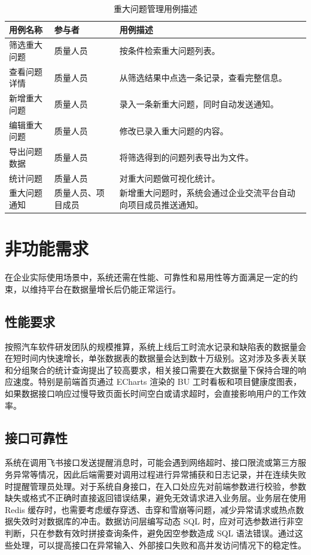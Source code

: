 \begin{table}[htbp]
	\centering
	\caption{重大问题管理用例描述}
	\label{tab:major-issue-usecase}
	{\songti\seuwuhao\selectfont
		\begin{tabular}{p{3.2cm} p{2.2cm} p{8.5cm}}
			\toprule
			用例名称 & 参与者 & 用例描述 \\
			\midrule
			筛选重大问题 & 质量人员 & 按条件检索重大问题列表。 \\
			查看问题详情 & 质量人员 & 从筛选结果中点选一条记录，查看完整信息。 \\
			新增重大问题 & 质量人员 & 录入一条新重大问题，同时自动发送通知。 \\
			编辑重大问题 & 质量人员 & 修改已录入重大问题的内容。 \\
			导出问题数据 & 质量人员 & 将筛选得到的问题列表导出为文件。 \\
			统计问题 & 质量人员 & 对重大问题做可视化统计。 \\
			重大问题通知 & 质量人员、项目成员 & 新增重大问题时，系统会通过企业交流平台自动向项目成员推送通知。 \\
			\bottomrule
		\end{tabular}
	}
\end{table}


\section{非功能需求}
在企业实际使用场景中，系统还需在性能、可靠性和易用性等方面满足一定的约束，以维持平台在数据量增长后仍能正常运行。

\subsection{性能要求}
按照汽车软件研发团队的规模推算，系统上线后工时流水记录和缺陷表的数据量会在短时间内快速增长，单张数据表的数据量会达到数十万级别。这对涉及多表关联和分组聚合的统计查询提出了较高要求，相关接口需要在大数据量下保持合理的响应速度。特别是前端首页通过 ECharts 渲染的 BU 工时看板和项目健康度图表，如果数据接口响应过慢导致页面长时间空白或请求超时，会直接影响用户的工作效率。

\subsection{接口可靠性}

系统在调用飞书接口发送提醒消息时，可能会遇到网络超时、接口限流或第三方服务异常等情况，因此后端需要对调用过程进行异常捕获和日志记录，并在连续失败时提醒管理员处理。对于系统自身接口，在入口处应先对前端参数进行校验，参数缺失或格式不正确时直接返回错误结果，避免无效请求进入业务层。业务层在使用 Redis 缓存时，也需要考虑缓存穿透、击穿和雪崩等问题，减少异常请求或热点数据失效时对数据库的冲击。数据访问层编写动态 SQL 时，应对可选参数进行非空判断，只在参数有效时拼接查询条件，避免因空参数造成 SQL 语法错误。通过这些处理，可以提高接口在异常输入、外部接口失败和高并发访问情况下的稳定性。

